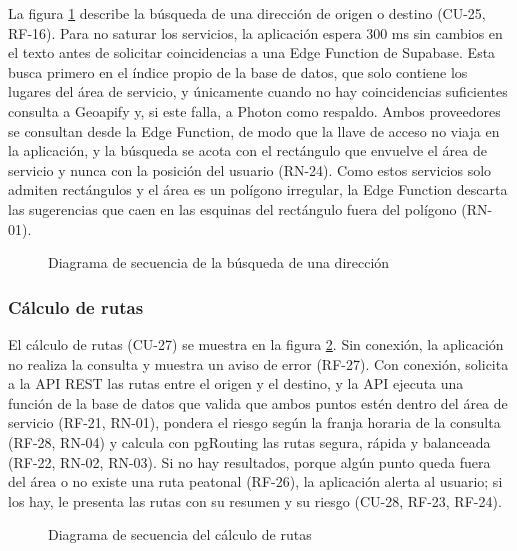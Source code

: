 La figura \ref{fig:sd_busqueda} describe la búsqueda de una dirección de origen o destino (CU-25, RF-16). Para no saturar los servicios, la aplicación espera 300 ms sin cambios en el texto antes de solicitar coincidencias a una Edge Function de Supabase. Esta busca primero en el índice propio de la base de datos, que solo contiene los lugares del área de servicio, y únicamente cuando no hay coincidencias suficientes consulta a Geoapify y, si este falla, a Photon como respaldo. Ambos proveedores se consultan desde la Edge Function, de modo que la llave de acceso no viaja en la aplicación, y la búsqueda se acota con el rectángulo que envuelve el área de servicio y nunca con la posición del usuario (RN-24). Como estos servicios solo admiten rectángulos y el área es un polígono irregular, la Edge Function descarta las sugerencias que caen en las esquinas del rectángulo fuera del polígono (RN-01).

\begin{figure}[htbp]
    \centering
    
    \caption{Diagrama de secuencia de la búsqueda de una dirección}
    \label{fig:sd_busqueda}
\end{figure}

\subsubsection{Cálculo de rutas}

El cálculo de rutas (CU-27) se muestra en la figura \ref{fig:sd_rutas}. Sin conexión, la aplicación no realiza la consulta y muestra un aviso de error (RF-27). Con conexión, solicita a la API REST las rutas entre el origen y el destino, y la API ejecuta una función de la base de datos que valida que ambos puntos estén dentro del área de servicio (RF-21, RN-01), pondera el riesgo según la franja horaria de la consulta (RF-28, RN-04) y calcula con pgRouting las rutas segura, rápida y balanceada (RF-22, RN-02, RN-03). Si no hay resultados, porque algún punto queda fuera del área o no existe una ruta peatonal (RF-26), la aplicación alerta al usuario; si los hay, le presenta las rutas con su resumen y su riesgo (CU-28, RF-23, RF-24).

\begin{figure}[htbp]
    \centering
    
    \caption{Diagrama de secuencia del cálculo de rutas}
    \label{fig:sd_rutas}
\end{figure}

